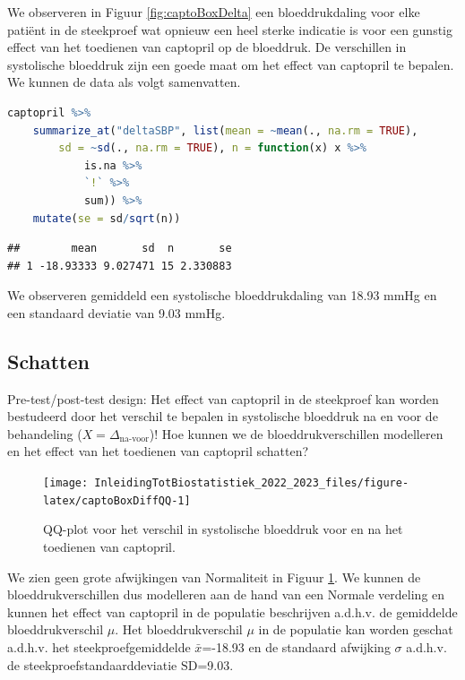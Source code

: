 \documentclass[
  12pt,dutch,coursenotes]{book}
\begin{document}
We observeren in Figuur \ref{fig:captoBoxDelta} een bloeddrukdaling voor elke patiënt in de steekproef wat opnieuw een heel sterke indicatie is voor een gunstig effect van het toedienen van captopril op de bloeddruk.
De verschillen in systolische bloeddruk zijn een goede maat om het effect van captopril te bepalen.
We kunnen de data als volgt samenvatten.

\begin{lstlisting}[language=R]
captopril %>%
    summarize_at("deltaSBP", list(mean = ~mean(., na.rm = TRUE),
        sd = ~sd(., na.rm = TRUE), n = function(x) x %>%
            is.na %>%
            `!` %>%
            sum)) %>%
    mutate(se = sd/sqrt(n))
\end{lstlisting}

\begin{lstlisting}
##        mean       sd  n       se
## 1 -18.93333 9.027471 15 2.330883
\end{lstlisting}

We observeren gemiddeld een systolische bloeddrukdaling van 18.93 mmHg en een standaard deviatie van 9.03 mmHg.

\hypertarget{schatten}{%
\subsection{Schatten}\label{schatten}}

Pre-test/post-test design: Het effect van captopril in de steekproef kan worden bestudeerd door het verschil te bepalen in systolische bloeddruk na en voor de behandeling (\(X=\Delta_\text{na-voor}\))!
Hoe kunnen we de bloeddrukverschillen modelleren en het effect van het toedienen van captopril schatten?

\begin{figure}

{\centering \texttt{[image: InleidingTotBiostatistiek\_2022\_2023\_files/figure-latex/captoBoxDiffQQ-1]} 

}

\caption{QQ-plot voor het verschil in systolische bloeddruk voor en na het toedienen van captopril.}\label{fig:captoBoxDiffQQ}
\end{figure}

We zien geen grote afwijkingen van Normaliteit in Figuur \ref{fig:captoBoxDiffQQ}.
We kunnen de bloeddrukverschillen dus modelleren aan de hand van een Normale verdeling en kunnen het effect van captopril in de populatie beschrijven a.d.h.v. de gemiddelde bloeddrukverschil \(\mu\).
Het bloeddrukverschil \(\mu\) in de populatie kan worden geschat a.d.h.v. het steekproefgemiddelde \(\bar x\)=-18.93 en de standaard afwijking \(\sigma\) a.d.h.v. de steekproefstandaarddeviatie \(\text{SD}\)=9.03.
\end{document}
